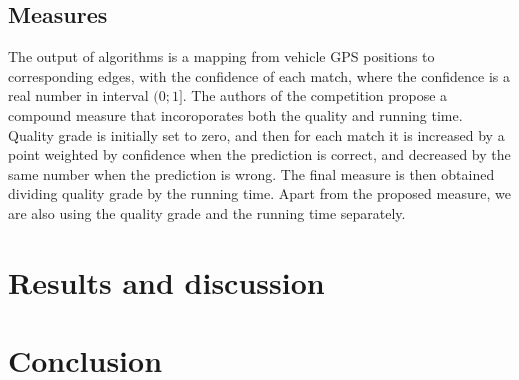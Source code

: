 \documentclass[a4paper,twoside,11pt]{article}
\theoremstyle{plain}
\theoremstyle{definition}  %
\begin{document}
\subsection*{Measures}
The output of algorithms is a mapping from vehicle GPS positions
to corresponding edges, with the confidence of each match, where
the confidence is a real number in interval $(0;1]$.
The authors of the competition propose a compound measure
that incoroporates both the quality and running time.
Quality grade is initially set to zero, and then for each match it is increased by
a point weighted by confidence when the prediction is correct,
and decreased by the same number when the prediction is wrong.
The final measure is then obtained dividing quality grade by the running time.
Apart from the proposed measure, we are also using the quality grade
and the running time separately.


\section{Results and discussion}
\label{sec:results}


\section{Conclusion}
\label{sec:conclusion}





\end{document}
